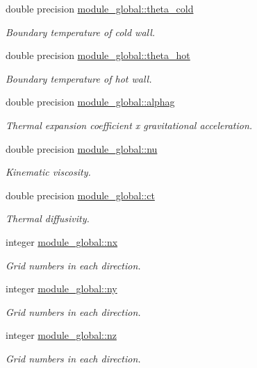 \begin{DoxyCompactItemize}
double precision \mbox{\hyperlink{namespacemodule__global_abbd64b6182b14d2608b25bb750492f9c}{module\+\_\+global\+::theta\+\_\+cold}}
\begin{DoxyCompactList}\small\item\em Boundary temperature of cold wall. \end{DoxyCompactList}\item 
double precision \mbox{\hyperlink{namespacemodule__global_a3631c83fdd972ed87e810c7f1c91cd46}{module\+\_\+global\+::theta\+\_\+hot}}
\begin{DoxyCompactList}\small\item\em Boundary temperature of hot wall. \end{DoxyCompactList}\item 
double precision \mbox{\hyperlink{namespacemodule__global_adb7b5cd9635d90845f8b091ca401d382}{module\+\_\+global\+::alphag}}
\begin{DoxyCompactList}\small\item\em Thermal expansion coefficient x gravitational acceleration. \end{DoxyCompactList}\item 
double precision \mbox{\hyperlink{namespacemodule__global_a43917539024b43bd2007b55a17813f70}{module\+\_\+global\+::nu}}
\begin{DoxyCompactList}\small\item\em Kinematic viscosity. \end{DoxyCompactList}\item 
double precision \mbox{\hyperlink{namespacemodule__global_ab185cd164bb8dbff63e1fd6980be4f9d}{module\+\_\+global\+::ct}}
\begin{DoxyCompactList}\small\item\em Thermal diffusivity. \end{DoxyCompactList}\end{DoxyCompactItemize}
\textbf{ }\par
\begin{DoxyCompactItemize}
\item 
integer \mbox{\hyperlink{namespacemodule__global_ab08f27937c57ba4ff61f3e468f1db2c4}{module\+\_\+global\+::nx}}
\begin{DoxyCompactList}\small\item\em Grid numbers in each direction. \end{DoxyCompactList}\item 
integer \mbox{\hyperlink{namespacemodule__global_a77c7285b11685f1b1cf6a0bee5b1237f}{module\+\_\+global\+::ny}}
\begin{DoxyCompactList}\small\item\em Grid numbers in each direction. \end{DoxyCompactList}\item 
integer \mbox{\hyperlink{namespacemodule__global_a5af0cf8dfa1e807f0ee9d14572e8b854}{module\+\_\+global\+::nz}}
\begin{DoxyCompactList}\small\item\em Grid numbers in each direction. \end{DoxyCompactList}\end{DoxyCompactItemize}

